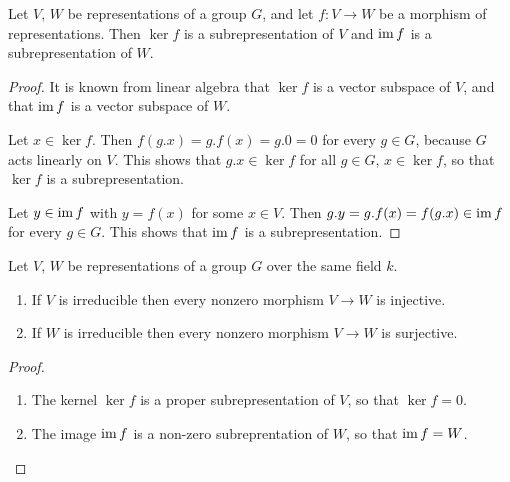 \begin{lemma}\label{lemma: ker and im subrepresentations}
  Let $V$, $W$ be representations of a group $G$, and let $f \colon V \to W$ be a morphism of representations.
  Then $\ker f$ is a subrepresentation of $V$ and $\operatorname{im} f$ is a subrepresentation of $W$.
\end{lemma}
\begin{proof}
  It is known from linear algebra that $\ker f$ is a vector subspace of $V$, and that $\operatorname{im} f$ is a vector subspace of $W$.
  
  Let $x \in \ker f$.
  Then $f(g.x) = g.f(x) = g.0 = 0$ for every $g \in G$, because $G$ acts linearly on $V$.
  This shows that $g.x \in \ker f$ for all $g \in G$, $x \in \ker f$, so that $\ker f$ is a subrepresentation.
  
  Let $y \in \operatorname{im} f$ with $y = f(x)$ for some $x \in V$.
  Then $g.y = g.f(x) = f(g.x) \in \operatorname{im} f$ for every $g \in G$.
  This shows that $\operatorname{im} f$ is a subrepresentation.
\end{proof}


\begin{lemma}
  \label{lemma: inj und surj for morphisms between irreducible}
  Let $V$, $W$ be representations of a group $G$ over the same field $k$.
  \begin{enumerate}
    \item
      If $V$ is irreducible then every nonzero morphism $V \to W$ is injective.
    \item
      If $W$ is irreducible then every nonzero morphism $V \to W$ is surjective.
  \end{enumerate}
\end{lemma}


\begin{proof}
  \leavevmode
  \begin{enumerate}
    \item
      The kernel $\ker f$ is a proper subrepresentation of $V$, so that $\ker f = 0$.
    \item
      The image $\operatorname{im} f$ is a non-zero subreprentation of $W$, so that $\operatorname{im} f = W$.
  \qedhere
  \end{enumerate}
\end{proof}


